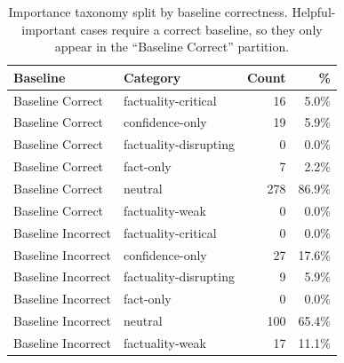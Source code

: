 \begin{table}[h]
\centering\small
\begin{tabular}{llrr}
\toprule
Baseline & Category & Count & \% \\
\midrule
  Baseline Correct & factuality-critical & 16 & 5.0\% \\
  Baseline Correct & confidence-only & 19 & 5.9\% \\
  Baseline Correct & factuality-disrupting & 0 & 0.0\% \\
  Baseline Correct & fact-only & 7 & 2.2\% \\
  Baseline Correct & neutral & 278 & 86.9\% \\
  Baseline Correct & factuality-weak & 0 & 0.0\% \\
  Baseline Incorrect & factuality-critical & 0 & 0.0\% \\
  Baseline Incorrect & confidence-only & 27 & 17.6\% \\
  Baseline Incorrect & factuality-disrupting & 9 & 5.9\% \\
  Baseline Incorrect & fact-only & 0 & 0.0\% \\
  Baseline Incorrect & neutral & 100 & 65.4\% \\
  Baseline Incorrect & factuality-weak & 17 & 11.1\% \\
\bottomrule
\end{tabular}
\caption{Importance taxonomy split by baseline correctness. Helpful-important cases require a correct baseline, so they only appear in the ``Baseline Correct'' partition.}
\label{tab:e2_taxonomy_by_baseline}
\end{table}
